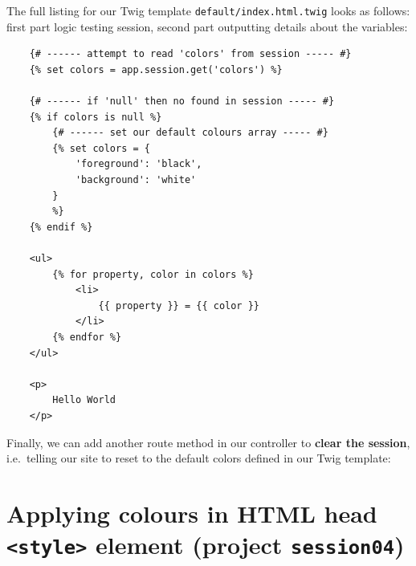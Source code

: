 \documentclass[a4paperpaper,openright]{book}
\newenvironment{Shaded}{}{}
\newcommand{\AnnotationTok}[1]{\textcolor[rgb]{0.38,0.63,0.69}{\textbf{\textit{#1}}}}
\newcommand{\CommentTok}[1]{\textcolor[rgb]{0.38,0.63,0.69}{\textit{#1}}}
\newcommand{\KeywordTok}[1]{\textcolor[rgb]{0.00,0.44,0.13}{\textbf{#1}}}
\newcommand{\NormalTok}[1]{#1}
\newcommand{\OtherTok}[1]{\textcolor[rgb]{0.00,0.44,0.13}{#1}}
\newcommand{\StringTok}[1]{\textcolor[rgb]{0.25,0.44,0.63}{#1}}
\begin{document}
The full listing for our Twig template \texttt{default/index.html.twig}
looks as follows: first part logic testing session, second part
outputting details about the variables:

\begin{verbatim}
    {# ------ attempt to read 'colors' from session ----- #}
    {% set colors = app.session.get('colors') %}

    {# ------ if 'null' then no found in session ----- #}
    {% if colors is null %}
        {# ------ set our default colours array ----- #}
        {% set colors = {
            'foreground': 'black',
            'background': 'white'
        }
        %}
    {% endif %}

    <ul>
        {% for property, color in colors %}
            <li>
                {{ property }} = {{ color }}
            </li>
        {% endfor %}
    </ul>

    <p>
        Hello World
    </p>
\end{verbatim}

Finally, we can add another route method in our controller to
\textbf{clear the session}, i.e.~telling our site to reset to the
default colors defined in our Twig template:

\begin{Shaded}
\end{Shaded}

\hypertarget{applying-colours-in-html-head-style-element-project-session04}{%
\section{\texorpdfstring{Applying colours in HTML head
\texttt{\textless{}style\textgreater{}} element (project
\texttt{session04})}{Applying colours in HTML head \textless{}style\textgreater{} element (project session04)}}\label{applying-colours-in-html-head-style-element-project-session04}}
\end{document}
